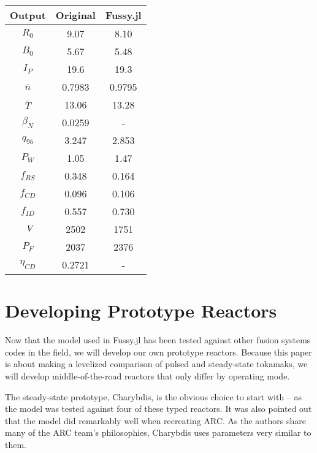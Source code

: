 \begin{table}[h!]
\begin{subtable}[t]{0.5\textwidth}
\begin{tabular}{ c|c|c }
Output           & Original         & Fussy.jl        \\
\hline
$R_{0}$          & 9.07            & 8.10             \\
$B_{0}$          & 5.67            & 5.48            \\
$I_{P}$          & 19.6             & 19.3           \\
$\overline n$    & 0.7983           & 0.9795          \\
$\overline T$    & 13.06            & 13.28           \\
$\beta_{N}$       & 0.0259           & -          \\
$q_{95}$         & 3.247            & 2.853           \\
$P_{W}$          & 1.05             & 1.47           \\
$f_{BS}$         & 0.348            & 0.164          \\
$f_{CD}$         & 0.096            & 0.106          \\
$f_{ID}$         & 0.557            & 0.730          \\
$\volume$         & 2502           & 1751          \\
$P_{F}$          & 2037           & 2376          \\
$\eta_{CD}$      & 0.2721           & -     

\end{tabular}
\end{subtable}
\hfill
\hfill
\end{table}

\section{Developing Prototype Reactors}

Now that the model used in Fussy.jl has been tested against other fusion systems codes in the field, we will develop our own prototype reactors. Because this paper is about making a levelized comparison of pulsed and steady-state tokamaks, we will develop middle-of-the-road reactors that only differ by operating mode. 

The steady-state prototype, Charybdis, is the obvious choice to start with -- as the model was tested against four of these typed reactors. It was also pointed out that the model did remarkably well when recreating ARC. As the authors share many of the ARC team's philosophies, Charybdis uses  parameters very similar to them.

